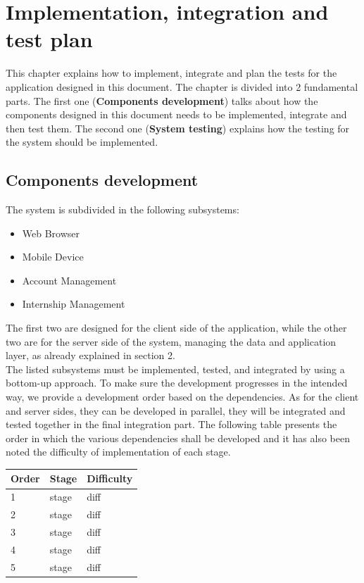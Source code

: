 \documentclass[11pt,twoside]{article}
\begin{document}
\newpage

\section{Implementation, integration and test plan}
This chapter explains how to implement, integrate and plan the tests for the application designed in this document. The chapter is divided into 2 fundamental parts. The first one (\textbf{Components development}) talks about how the components designed in this document needs to be implemented, integrate and then test them. The second one (\textbf{System testing}) explains how the testing for the system should be implemented.

	\subsection{Components development}
The system is subdivided in the following subsystems:
\begin{itemize}
\item Web Browser
\item Mobile Device
\item Account Management
\item Internship Management
\end{itemize}
The first two are designed for the client side of the application, while the other two are for the server side of the system, managing the data and application layer, as already explained in section 2.\\
The listed subsystems must be implemented, tested, and integrated by using a bottom-up approach. To make sure the development progresses in the intended way, we provide a development order based on the dependencies. As for the client and server sides, they can be developed in parallel, they will be integrated and tested together in the final integration part. The following table presents the order in which the various dependencies shall be developed and it has also been noted the difficulty of implementation of each stage.

\begin{table}[H]
\begin{tabular}{| p{} | p{} | p{} |} 
\hline
\textbf{Order} & \textbf{Stage} & \textbf{Difficulty} \\ 
\hline
1 & stage & diff \\ 
\hline
2 & stage & diff \\ 
\hline
3 & stage & diff \\ 
\hline
4 & stage & diff \\ 
\hline
5 & stage & diff \\ 
\hline
\end{tabular}
\end{table}
	
\end{document}
